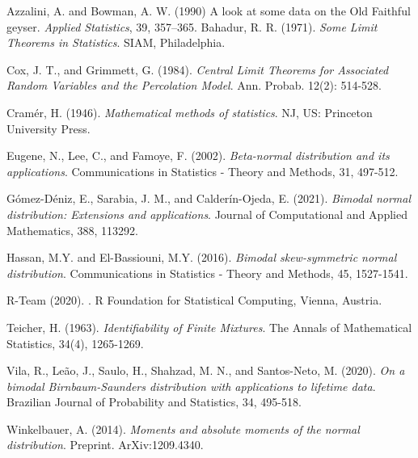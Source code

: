 \documentclass[12pt]{article}
\theoremstyle{definition}
\begin{document}
\small
\begin{thebibliography}{}
%
{Azzalini, A. and Bowman, A. W.} (1990) 
A look at some data on the Old Faithful geyser. 
\emph{Applied Statistics}, {39}, 357--365. 
%
Bahadur, R. R. (1971). 
\emph{Some Limit Theorems in Statistics}. 
SIAM, Philadelphia.

Cox, J. T., and  Grimmett, G. (1984).
\emph{Central Limit Theorems for Associated Random Variables and the Percolation Model}.
Ann. Probab. 12(2): 514-528. 

Cramér, H. (1946). 
\emph{Mathematical methods of statistics}. 
NJ, US: Princeton University Press.

Eugene, N., Lee, C., and Famoye, F. (2002). 
\emph{Beta-normal distribution and its applications}. 
Communications in Statistics - Theory and Methods, 31, 497-512.

G\'omez-D\'eniz, E., Sarabia, J. M., and Calderín-Ojeda, E. (2021). 
\emph{Bimodal normal distribution: Extensions and applications}. 
Journal of Computational and Applied Mathematics, 388, 113292.

Hassan, M.Y. and El-Bassiouni, M.Y. (2016). 
\emph{Bimodal skew-symmetric normal distribution}. 
Communications in Statistics - Theory and Methods, 45, 1527-1541.


R-Team (2020).
.
\newblock R Foundation for Statistical Computing, Vienna, Austria.

Teicher, H. (1963). 
\emph{Identifiability of Finite Mixtures}. 
The Annals of Mathematical Statistics, 34(4), 1265-1269.

Vila, R., Le\~ao, J., Saulo, H., Shahzad, M. N., and Santos-Neto, M. (2020). 
\emph{On a bimodal Birnbaum-Saunders distribution with applications to lifetime data}. 
Brazilian Journal of Probability and Statistics, 34, 495-518.

Winkelbauer, A. (2014). 
\emph{Moments and absolute moments of the normal distribution}.
Preprint. ArXiv:1209.4340.

 
\end{thebibliography}
\end{document}
